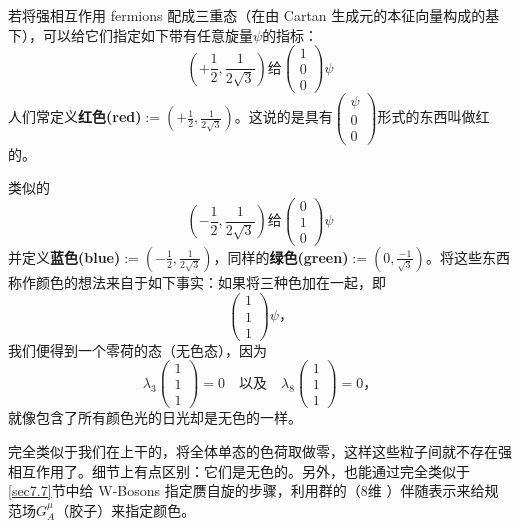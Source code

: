 若将强相互作用 fermions 配成三重态（在由 Cartan 生成元的本征向量构成的基下），可以给它们指定如下带有任意旋量$\psi$的指标：
\[
\left(+\frac{1}{2},\frac{1}{2\sqrt{3}}\right) \text{给} \begin{pmatrix}
1 \\ 0 \\ 0
\end{pmatrix}\psi
\]
人们常定义{\bf 红色(red)}$:=\left(+\frac{1}{2},\frac{1}{2\sqrt{3}}\right)$。这说的是具有$\begin{pmatrix}
\psi \\ 0 \\ 0
\end{pmatrix}$形式的东西叫做红的。

类似的
\[
\left(-\frac{1}{2},\frac{1}{2\sqrt{3}}\right) \text{给} \begin{pmatrix}
0 \\ 1 \\ 0
\end{pmatrix}\psi
\]
并定义{\bf 蓝色(blue)}$:=\left(-\frac{1}{2},\frac{1}{2\sqrt{3}}\right)$，同样的{\bf 绿色(green)}$:=\left(0,\frac{-1}{\sqrt{3}}\right)$。将这些东西称作颜色的想法来自于如下事实：如果将三种色加在一起，即
\[
\begin{pmatrix}
1 \\ 1 \\ 1
\end{pmatrix}\psi\text{，}
\]
我们便得到一个零荷的态（无色态），因为
\[
\lambda_3\begin{pmatrix}
1 \\ 1 \\ 1
\end{pmatrix}=0 \quad \text{以及} \quad \lambda_8\begin{pmatrix}
1 \\ 1 \\ 1
\end{pmatrix}=0\text{，}
\]
就像包含了所有颜色光的日光却是无色的一样。

完全类似于我们在\sutw 上干的，将全体\suth 单态的色荷取做零，这样这些粒子间就不存在强相互作用了。细节上有点区别：它们是无色的。另外，也能通过完全类似于\ref{sec7.7}节中给 W-Bosons 指定赝自旋的步骤，利用\suth 群的（$8$维%
%
）伴随表示来给规范场$G_A^\mu$（胶子）来指定颜色。
